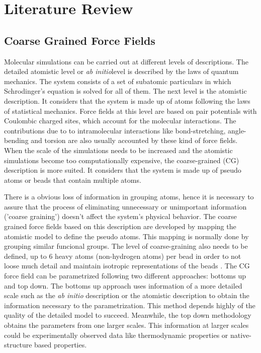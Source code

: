 
\chapter{Literature Review} %

\label{Chapter1} %


\section{Coarse Grained Force Fields}

Molecular simulations can be carried out at different levels of descriptions. The detailed atomistic level or \textit{ab initio}level is described by the laws of quantum mechanics. The system consists of a set of subatomic particulars in which Schrodinger's equation is solved for all of them. The next level is the atomistic description. It considers that the system is made up of atoms following the laws of statistical mechanics.  Force fields at this level are based on pair potentials with Coulombic charged sites, which account for the molecular interactions. The contributions due to to intramolecular interactions like bond-stretching, angle-bending and torsion are also usually accounted by these kind of force fields. When the scale of the simulations needs to be increased and the atomistic simulations become too computationally expensive, the coarse-grained (CG) description is more suited. It considers that the system is made up of pseudo atoms or beads that contain multiple atoms. 

There is a obvious loss of information in grouping atoms, hence it is necessary to assure that the process of eliminating unnecessary or unimportant information ('coarse graining') doesn't affect the system's physical behavior. The coarse grained force fields based on this description are developed by mapping the atomistic model to define the pseudo atoms. This mapping is normally done by grouping similar funcional groups. The level of coarse-graining also needs to be defined, up to 6 heavy atoms (non-hydrogen atoms) per bead in order to not loose much detail and maintain isotropic representations of the beads \cite{shinoda2007,martini2007,hadley2012}. The CG force field can be parametrized following two different approaches: bottoms up and top down. The bottoms up approach uses information of a more detailed scale such as the \textit{ab initio} description or the atomistic description to obtain the information necessary to the parametrization. This method depends highly of the quality of the detailed model to succeed. Meanwhile, the top down methodology obtains the parameters from one larger scales. This information at larger scales could be experimentally observed data like thermodynamic properties or native-structure based properties. 

